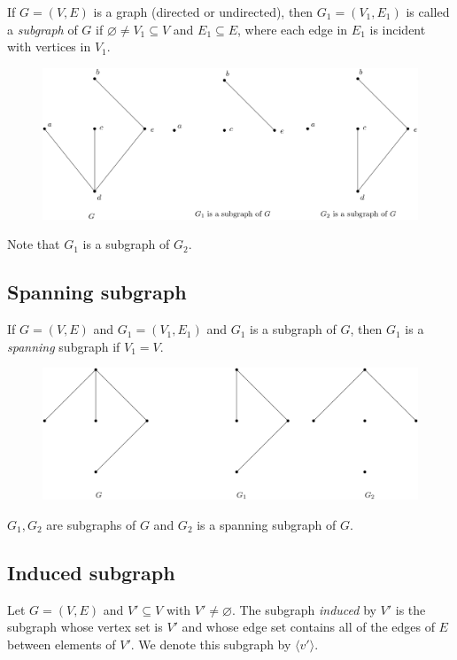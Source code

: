 \documentclass[11pt]{article}
\let\emptyset\varnothing
\begin{document}
    If \(G = (V,E)\) is a graph (directed or undirected), then \(G_1 = (V_1, E_1)\) is called a \emph{subgraph} of $G$ if \(\emptyset \neq V_1 \subseteq V\) and \(E_1 \subseteq E\), where each edge in \(E_1\) is incident with vertices in \(V_1\).

    \begin{figure}[H]
        \centering
        \includegraphics[scale=0.2]{subgraph.png}
    \end{figure}

    Note that $G_1$ is a subgraph of $G_2$.

    \subsection{Spanning subgraph}

    If \(G = (V,E)\) and \(G_1 = (V_1, E_1)\) and \(G_1\) is a subgraph of $G$, then \(G_1\) is a \emph{spanning} subgraph if \(V_1 = V\).

    \begin{figure}[H]
        \centering
        \includegraphics[scale=0.2]{spanning.png}
    \end{figure}
    \(G_1, G_2\) are subgraphs of $G$ and \(G_2\) is a spanning subgraph of $G$.

    \subsection{Induced subgraph}

    Let \(G = (V,E)\) and \(V' \subseteq V\) with \(V' \neq \emptyset\). The subgraph \emph{induced} by \(V'\) is the subgraph whose vertex set is \(V'\) and whose edge set contains all of the edges of $E$ between elements of \(V'\). We denote this subgraph by \(\langle v' \rangle\).
\end{document}
